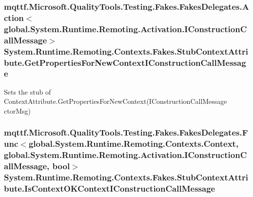 \hypertarget{class_system_1_1_runtime_1_1_remoting_1_1_contexts_1_1_fakes_1_1_stub_context_attribute_a0718837b88e46651d0df26e4ea136a62}{
\subsubsection[{Get\-Properties\-For\-New\-Context\-I\-Construction\-Call\-Message}]{\setlength{\rightskip}{0pt plus 5cm}mqttf.\-Microsoft.\-Quality\-Tools.\-Testing.\-Fakes.\-Fakes\-Delegates.\-Action$<$global.\-System.\-Runtime.\-Remoting.\-Activation.\-I\-Construction\-Call\-Message$>$ System.\-Runtime.\-Remoting.\-Contexts.\-Fakes.\-Stub\-Context\-Attribute.\-Get\-Properties\-For\-New\-Context\-I\-Construction\-Call\-Message}}\label{class_system_1_1_runtime_1_1_remoting_1_1_contexts_1_1_fakes_1_1_stub_context_attribute_a0718837b88e46651d0df26e4ea136a62}


Sets the stub of Context\-Attribute.\-Get\-Properties\-For\-New\-Context(\-I\-Construction\-Call\-Message ctor\-Msg)

\hypertarget{class_system_1_1_runtime_1_1_remoting_1_1_contexts_1_1_fakes_1_1_stub_context_attribute_af60926687c34b0bd740fdd7997a24751}{
\subsubsection[{Is\-Context\-O\-K\-Context\-I\-Construction\-Call\-Message}]{\setlength{\rightskip}{0pt plus 5cm}mqttf.\-Microsoft.\-Quality\-Tools.\-Testing.\-Fakes.\-Fakes\-Delegates.\-Func$<$global.\-System.\-Runtime.\-Remoting.\-Contexts.\-Context, global.\-System.\-Runtime.\-Remoting.\-Activation.\-I\-Construction\-Call\-Message, bool$>$ System.\-Runtime.\-Remoting.\-Contexts.\-Fakes.\-Stub\-Context\-Attribute.\-Is\-Context\-O\-K\-Context\-I\-Construction\-Call\-Message}}\label{class_system_1_1_runtime_1_1_remoting_1_1_contexts_1_1_fakes_1_1_stub_context_attribute_af60926687c34b0bd740fdd7997a24751}


